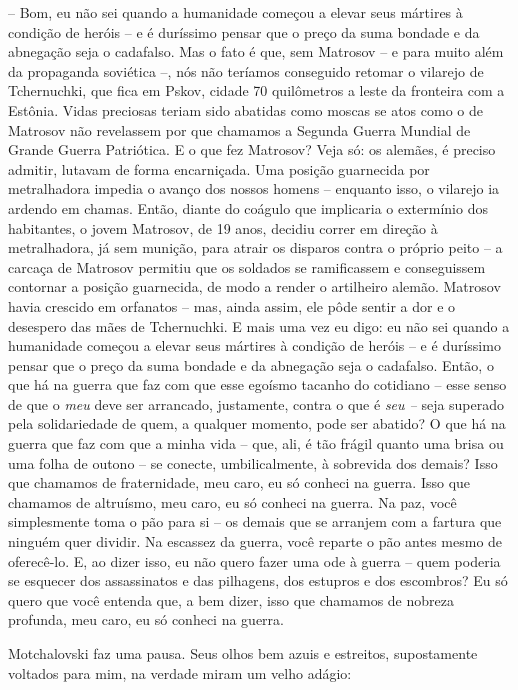 -- Bom, eu não sei quando a humanidade começou a elevar seus mártires à
condição de heróis -- e é duríssimo pensar que o preço da suma bondade e
da abnegação seja o cadafalso. Mas o fato é que, sem Matrosov -- e para
muito além da propaganda soviética --, nós não teríamos conseguido
retomar o vilarejo de Tchernuchki, que fica em Pskov, cidade 70
quilômetros a leste da fronteira com a Estônia. Vidas preciosas teriam
sido abatidas como moscas se atos como o de Matrosov não revelassem por
que chamamos a Segunda Guerra Mundial de Grande Guerra Patriótica. E o
que fez Matrosov? Veja só: os alemães, é preciso admitir, lutavam de
forma encarniçada. Uma posição guarnecida por metralhadora impedia o
avanço dos nossos homens -- enquanto isso, o vilarejo ia ardendo em
chamas. Então, diante do coágulo que implicaria o extermínio dos
habitantes, o jovem Matrosov, de 19 anos, decidiu correr em direção à
metralhadora, já sem munição, para atrair os disparos contra o próprio
peito -- a carcaça de Matrosov permitiu que os soldados se ramificassem
e conseguissem contornar a posição guarnecida, de modo a render o
artilheiro alemão. Matrosov havia crescido em orfanatos -- mas, ainda
assim, ele pôde sentir a dor e o desespero das mães de Tchernuchki. E
mais uma vez eu digo: eu não sei quando a humanidade começou a elevar
seus mártires à condição de heróis -- e é duríssimo pensar que o preço
da suma bondade e da abnegação seja o cadafalso. Então, o que há na
guerra que faz com que esse egoísmo tacanho do cotidiano -- esse senso
de que o \emph{meu} deve ser arrancado, justamente, contra o que é
\emph{seu --} seja superado pela solidariedade de quem, a qualquer
momento, pode ser abatido? O que há na guerra que faz com que a minha
vida -- que, ali, é tão frágil quanto uma brisa ou uma folha de outono
-- se conecte, umbilicalmente, à sobrevida dos demais? Isso que chamamos
de fraternidade, meu caro, eu só conheci na guerra. Isso que chamamos de
altruísmo, meu caro, eu só conheci na guerra. Na paz, você simplesmente
toma o pão para si -- os demais que se arranjem com a fartura que
ninguém quer dividir. Na escassez da guerra, você reparte o pão antes
mesmo de oferecê-lo. E, ao dizer isso, eu não quero fazer uma ode à
guerra -- quem poderia se esquecer dos assassinatos e das pilhagens, dos
estupros e dos escombros? Eu só quero que você entenda que, a bem dizer,
isso que chamamos de nobreza profunda, meu caro, eu só conheci na
guerra.

Motchalovski faz uma pausa. Seus olhos bem azuis e estreitos,
supostamente voltados para mim, na verdade miram um velho adágio:

